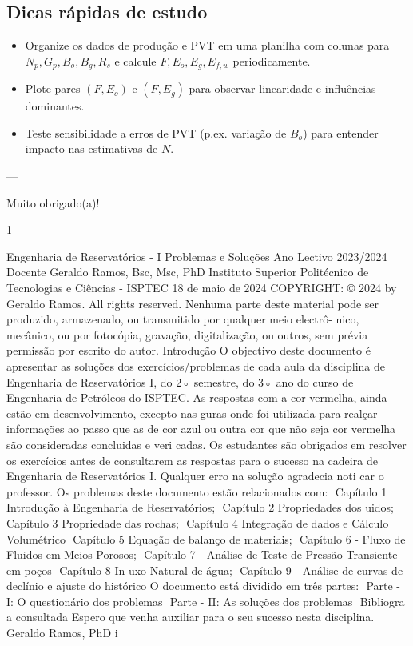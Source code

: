 \documentclass[11pt,a4paper]{article}
\begin{document}
\subsection{Dicas rápidas de estudo}
\begin{itemize}
\item Organize os dados de produção e PVT em uma planilha com colunas para $N_p,G_p,B_o,B_g,R_s$ e calcule $F,E_o,E_g,E_{f,w}$ periodicamente.
\item Plote pares $(F,E_o)$ e $(F,E_g)$ para observar linearidade e influências dominantes.
\item Teste sensibilidade a erros de PVT (p.ex. variação de $B_o$) para entender impacto nas estimativas de $N$.
\end{itemize}

---

Muito obrigado(a)!




1



Engenharia de Reservatórios - I
Problemas e Soluções
Ano Lectivo 2023/2024
Docente
Geraldo Ramos, Bsc, Msc, PhD
Instituto Superior Politécnico de Tecnologias e Ciências - ISPTEC
18 de maio de 2024
COPYRIGHT: © 2024 by Geraldo Ramos. All rights reserved.
Nenhuma parte deste material pode ser produzido, armazenado, ou transmitido por qualquer meio electrô-
nico, mecânico, ou por fotocópia, gravação, digitalização, ou outros, sem prévia permissão por escrito do
autor.
Introdução
O objectivo deste documento é apresentar as soluções dos exercícios/problemas de cada aula da disciplina de
Engenharia de Reservatórios I, do 2◦ semestre, do 3◦ ano do curso de Engenharia de Petróleos do ISPTEC.
As respostas com a cor vermelha, ainda estão em desenvolvimento, excepto nas 
guras onde foi utilizada
para realçar informações ao passo que as de cor azul ou outra cor que não seja cor vermelha são consideradas
concluidas e veri
cadas.
Os estudantes são obrigados em resolver os exercícios antes de consultarem as respostas para o sucesso na
cadeira de Engenharia de Reservatórios I. Qualquer erro na solução agradecia noti
car o professor.
Os problemas deste documento estão relacionados com:
 Capítulo 1  Introdução à Engenharia de Reservatórios;
 Capítulo 2  Propriedades dos 
uidos;
 Capítulo 3  Propriedade das rochas;
 Capítulo 4  Integração de dados e Cálculo Volumétrico
 Capítulo 5  Equação de balanço de materiais;
 Capítulo 6 - Fluxo de Fluidos em Meios Porosos;
 Capítulo 7 - Análise de Teste de Pressão Transiente em poços
 Capítulo 8  In
uxo Natural de água;
 Capítulo 9 - Análise de curvas de declínio e ajuste do histórico
O documento está dividido em três partes:
 Parte - I: O questionário dos problemas
 Parte - II: As soluções dos problemas
 Bibliogra
a consultada
Espero que venha auxiliar para o seu sucesso nesta disciplina.
Geraldo Ramos, PhD
i
\end{document}

